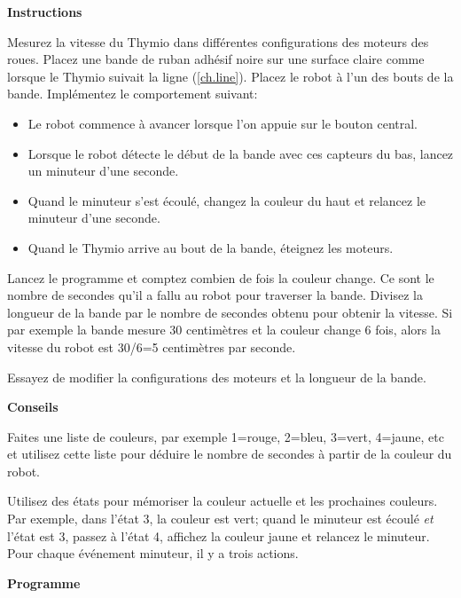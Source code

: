\label{ch.speed}

\textbf{Instructions}

Mesurez la vitesse du Thymio dans différentes configurations des moteurs des roues.
Placez une bande de ruban adhésif noire sur une surface claire comme lorsque le Thymio
suivait la ligne (\cref{ch.line}).
Placez le robot à l'un des bouts de la bande. Implémentez le comportement suivant:

\begin{itemize}

\item Le robot commence à avancer lorsque l'on appuie sur le bouton central.

\item Lorsque le robot détecte le début de la bande avec ces capteurs du bas,
    lancez un minuteur d'une seconde.

\item Quand le minuteur s'est écoulé, changez la couleur du haut et relancez le minuteur d'une seconde.

\item Quand le Thymio arrive au bout de la bande, éteignez les moteurs.

    \end{itemize}

Lancez le programme et comptez combien de fois la couleur change.
Ce sont le nombre de secondes qu'il a fallu au robot pour traverser la bande.
Divisez la longueur de la bande par le nombre de secondes obtenu pour obtenir la vitesse.
Si par exemple la bande mesure 30 centimètres et la couleur change 6 fois, alors la vitesse
du robot est 30/6=5 centimètres par seconde.

Essayez de modifier la configurations des moteurs et la longueur de la bande.

\textbf{Conseils}

Faites une liste de couleurs, par exemple 1=rouge, 2=bleu, 3=vert, 4=jaune, etc
et utilisez cette liste pour déduire le nombre de secondes à partir de la couleur du robot.

Utilisez des états pour mémoriser la couleur actuelle et les prochaines couleurs.
Par exemple, dans l'état 3, la couleur est vert; quand le minuteur est écoulé \emph{et}
l'état est 3, passez à l'état 4, affichez la couleur jaune et relancez le minuteur.
Pour chaque événement minuteur, il y a trois actions.

\bigskip

{\raggedleft \hfill \textbf{Programme} }

